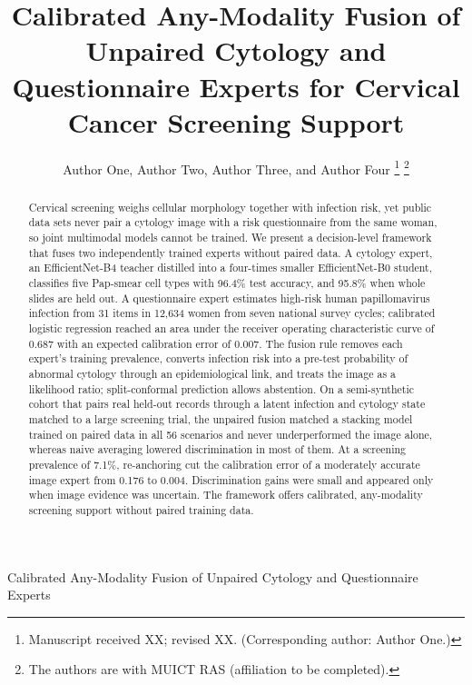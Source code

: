 \documentclass[lettersize,journal]{IEEEtran}
\begin{document}
\title{Calibrated Any-Modality Fusion of Unpaired Cytology and Questionnaire Experts for Cervical Cancer Screening Support}

\author{Author One, Author Two, Author Three, and Author Four
\thanks{Manuscript received XX; revised XX. (Corresponding author: Author One.)}
\thanks{The authors are with MUICT RAS (affiliation to be completed).}}

%
{Calibrated Any-Modality Fusion of Unpaired Cytology and Questionnaire Experts}

\maketitle

\begin{abstract}
Cervical screening weighs cellular morphology together with infection risk, yet public data sets never pair a cytology image with a risk questionnaire from the same woman, so joint multimodal models cannot be trained. We present a decision-level framework that fuses two independently trained experts without paired data. A cytology expert, an EfficientNet-B4 teacher distilled into a four-times smaller EfficientNet-B0 student, classifies five Pap-smear cell types with 96.4\% test accuracy, and 95.8\% when whole slides are held out. A questionnaire expert estimates high-risk human papillomavirus infection from 31 items in 12,634 women from seven national survey cycles; calibrated logistic regression reached an area under the receiver operating characteristic curve of 0.687 with an expected calibration error of 0.007. The fusion rule removes each expert's training prevalence, converts infection risk into a pre-test probability of abnormal cytology through an epidemiological link, and treats the image as a likelihood ratio; split-conformal prediction allows abstention. On a semi-synthetic cohort that pairs real held-out records through a latent infection and cytology state matched to a large screening trial, the unpaired fusion matched a stacking model trained on paired data in all 56 scenarios and never underperformed the image alone, whereas naive averaging lowered discrimination in most of them. At a screening prevalence of 7.1\%, re-anchoring cut the calibration error of a moderately accurate image expert from 0.176 to 0.004. Discrimination gains were small and appeared only when image evidence was uncertain. The framework offers calibrated, any-modality screening support without paired training data.
\end{abstract}
\end{document}
